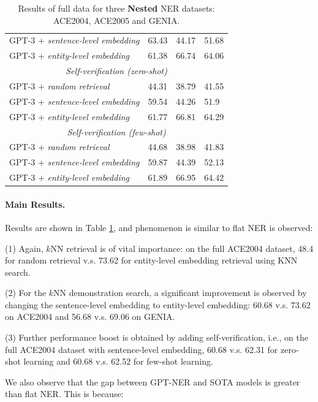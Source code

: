 \documentclass[11pt]{article}
\begin{document}
\begin{table}[th!]
{\begin{tabular}{llll}
        GPT-3 + \textit{sentence-level embedding} & 63.43 & 44.17 & 51.68 \\
        GPT-3 + \textit{entity-level embedding} & 61.38 & 66.74 & 64.06 \\\midrule
        \multicolumn{4}{c}{{\it Self-verification (zero-shot)}} \\\midrule
        GPT-3 + \textit{random retrieval} & 44.31 & 38.79 & 41.55 \\
        GPT-3 + \textit{sentence-level embedding} & 59.54 & 44.26 & 51.9 \\
        GPT-3 + \textit{entity-level embedding} & 61.77 & 66.81 & 64.29 \\\midrule
        \multicolumn{4}{c}{{\it Self-verification (few-shot)}} \\\midrule
        GPT-3 + \textit{random retrieval} & 44.68 & 38.98 & 41.83 \\
        GPT-3 + \textit{sentence-level embedding} & 59.87 & 44.39 & 52.13 \\
        GPT-3 + \textit{entity-level embedding} & 61.89 & 66.95 & 64.42 \\\bottomrule
    \end{tabular}
    }
     \caption{Results of full data for three \textbf{Nested} NER datasets: ACE2004, ACE2005 and GENIA.}
    \label{tab:nest_ner_result}
\end{table}

\paragraph{Main Results.}

Results are shown in Table \ref{tab:nest_ner_result}, and phenomenon is similar to flat NER is observed: 

(1) Again, $k$NN retrieval is of vital importance: on the full ACE2004 dataset, 48.4 for random retrieval v.s. 73.62 for entity-level embedding retrieval using KNN search.

(2) For the $k$NN demonstration search, a significant improvement is observed by changing the sentence-level embedding to entity-level embedding: 60.68 v.s. 73.62 on  ACE2004  and 56.68 v.s. 69.06 on  GENIA.

(3)  Further performance boost is obtained by adding self-verification, i.e., on the full ACE2004 dataset with sentence-level embedding, 60.68 v.s. 62.31 for zero-shot learning and 60.68 v.s. 62.52 for few-shot learning.

We also observe that the gap between  GPT-NER  and SOTA models is greater than flat NER. This is because:
\end{document}
